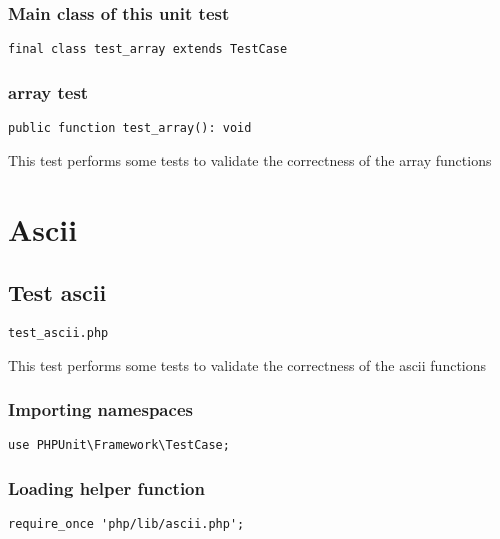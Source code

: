 \documentclass[a4paper]{article}
\begin{document}
\hypertarget{toc42}{}
\subsubsection{Main class of this unit test}

\begin{lstlisting}
final class test_array extends TestCase
\end{lstlisting}

\hypertarget{toc43}{}
\subsubsection{array test}

\begin{lstlisting}
public function test_array(): void
\end{lstlisting}

This test performs some tests to validate the correctness
of the array functions


\hypertarget{toc44}{}
\section{Ascii}

\hypertarget{toc45}{}
\subsection{Test ascii}

\begin{lstlisting}
test_ascii.php
\end{lstlisting}

This test performs some tests to validate the correctness
of the ascii functions

\hypertarget{toc46}{}
\subsubsection{Importing namespaces}

\begin{lstlisting}
use PHPUnit\Framework\TestCase;
\end{lstlisting}

\hypertarget{toc47}{}
\subsubsection{Loading helper function}

\begin{lstlisting}
require_once 'php/lib/ascii.php';
\end{lstlisting}
\end{document}
